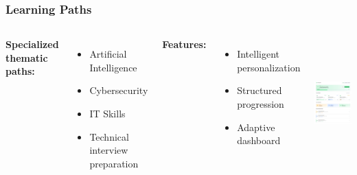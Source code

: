 \documentclass{beamer}
\begin{document}
\begin{frame}
\frametitle{Learning Paths}
\begin{columns}
\textbf{Specialized thematic paths:}
\begin{itemize}
    \item Artificial Intelligence
    \item Cybersecurity
    \item IT Skills
    \item Technical interview preparation
\end{itemize}
\textbf{Features:}
\begin{itemize}
    \item Intelligent personalization
    \item Structured progression
    \item Adaptive dashboard
\end{itemize}

\begin{center}
    \includegraphics[width=\textwidth,height=5cm,keepaspectratio]{old-reports/week_4_img/learnpath.jpeg}
\end{center}
\end{columns}
\end{frame}
\end{document}
